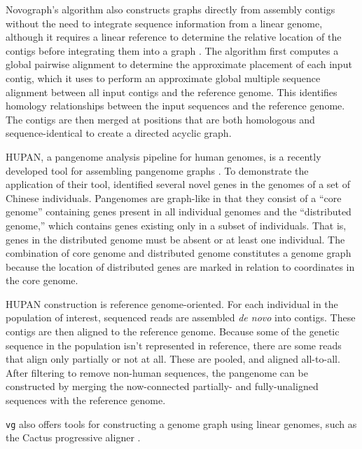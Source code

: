 Novograph's algorithm also constructs graphs directly from assembly contigs without the need to integrate sequence information from a linear genome, although it requires a linear reference to determine the relative location of the contigs before integrating them into a graph \cite{Biederstedt2018}. 
The algorithm first computes a global pairwise alignment to determine the approximate placement of each input contig, which it uses to perform an approximate global multiple sequence alignment between all input contigs and the reference genome.
This identifies homology relationships between the input sequences and the reference genome.
The contigs are then merged at positions that are both homologous and sequence-identical to create a directed acyclic graph.

 
HUPAN, a pangenome analysis pipeline for human genomes, is a recently developed tool for assembling pangenome graphs \cite{Duan_2019}. 
To demonstrate the application of their tool, \citep{Duan_2019} identified several novel genes in the genomes of a set of Chinese individuals.
Pangenomes are graph-like in that they consist of a ``core genome'' containing genes present in all individual genomes and the ``distributed genome,'' which contains genes existing only in a subset of individuals.
That is, genes in the distributed genome must be absent or at least one individual.
The combination of core genome and distributed genome constitutes a genome graph because the location of distributed genes are marked in relation to coordinates in the core genome.

HUPAN construction is reference genome-oriented.
For each individual in the population of interest, sequenced reads are assembled \textit{de novo} into contigs.
These contigs are then aligned to the reference genome.
Because some of the genetic sequence in the population isn't represented in reference, there are some reads that align only partially or not at all.
These are pooled, and aligned all-to-all.
After filtering to remove non-human sequences, the pangenome can be constructed by merging the now-connected partially- and fully-unaligned sequences with the reference genome.

\texttt{vg} also offers tools for constructing a genome graph using linear genomes, such as the Cactus progressive aligner \cite{Garrison_2018}.


